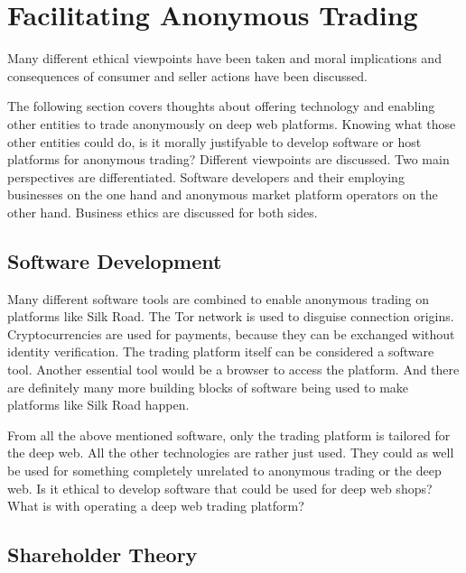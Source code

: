 \section{Facilitating Anonymous Trading}
\label{tech}


Many different ethical viewpoints have been taken and moral implications and consequences of consumer and seller actions have been discussed.

The following section covers thoughts about offering technology and enabling other entities to trade anonymously on deep web platforms. Knowing what those other entities could do, is it morally justifyable to develop software or host platforms for anonymous trading? Different viewpoints are discussed. Two main perspectives are differentiated. Software developers and their employing businesses on the one hand and anonymous market platform operators on the other hand. Business ethics are discussed for both sides.

\subsection{Software Development}

Many different software tools are combined to enable anonymous trading on platforms like Silk Road. The Tor network is used to disguise connection origins. Cryptocurrencies are used for payments, because they can be exchanged without identity verification. The trading platform itself can be considered a software tool. Another essential tool would be a browser to access the platform. And there are definitely many more building blocks of software being used to make platforms like Silk Road happen.

From all the above mentioned software, only the trading platform is tailored for the deep web. All the other technologies are rather just used. They could as well be used for something completely unrelated to anonymous trading or the deep web. Is it ethical to develop software that could be used for deep web shops? What is with operating a deep web trading platform?

\subsection{Shareholder Theory}

